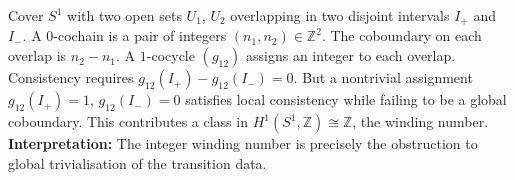 \begin{WorkedExample}[$H^1(S^1, \mathbb{Z})$]
  Cover $S^1$ with two open sets $U_1$, $U_2$ overlapping in
  two disjoint intervals $I_+$ and $I_-$.
  A $0$-cochain is a pair of integers $(n_1, n_2) \in \mathbb{Z}^2$.
  The coboundary on each overlap is $n_2 - n_1$.
  A $1$-cocycle $(g_{12})$ assigns an integer to each overlap.
  Consistency requires $g_{12}(I_+) - g_{12}(I_-) = 0$.
  But a nontrivial assignment $g_{12}(I_+) = 1$,
  $g_{12}(I_-) = 0$ satisfies local consistency while failing
  to be a global coboundary.
  This contributes a class in $H^1(S^1, \mathbb{Z}) \cong \mathbb{Z}$,
  the winding number.
  \textbf{Interpretation:} The integer winding number is precisely
  the obstruction to global trivialisation of the transition data.
\end{WorkedExample}

\begin{ProblemSet}
\end{ProblemSet}
